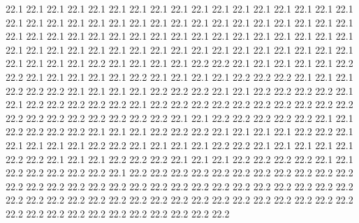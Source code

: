 22.1
22.1
22.1
22.1
22.1
22.1
22.1
22.1
22.1
22.1
22.1
22.1
22.1
22.1
22.1
22.1
22.1
22.1
22.1
22.1
22.1
22.1
22.1
22.1
22.1
22.1
22.1
22.1
22.1
22.1
22.1
22.1
22.1
22.1
22.1
22.1
22.1
22.1
22.1
22.1
22.1
22.1
22.1
22.1
22.1
22.1
22.1
22.1
22.1
22.1
22.1
22.1
22.1
22.1
22.1
22.1
22.1
22.1
22.1
22.1
22.1
22.1
22.1
22.1
22.1
22.1
22.1
22.1
22.1
22.1
22.1
22.1
22.2
22.1
22.1
22.1
22.1
22.2
22.2
22.1
22.1
22.1
22.1
22.1
22.2
22.2
22.1
22.1
22.1
22.1
22.1
22.2
22.1
22.1
22.1
22.1
22.2
22.2
22.2
22.1
22.1
22.1
22.2
22.2
22.2
22.1
22.1
22.1
22.1
22.2
22.2
22.2
22.1
22.1
22.2
22.2
22.2
22.2
22.1
22.1
22.2
22.2
22.2
22.2
22.2
22.1
22.2
22.2
22.2
22.2
22.2
22.2
22.2
22.2
22.2
22.2
22.2
22.2
22.2
22.2
22.2
22.2
22.2
22.2
22.1
22.1
22.2
22.2
22.2
22.2
22.2
22.1
22.1
22.2
22.2
22.2
22.2
22.1
22.1
22.1
22.2
22.2
22.2
22.1
22.1
22.1
22.1
22.2
22.2
22.1
22.1
22.1
22.1
22.1
22.2
22.2
22.1
22.1
22.1
22.1
22.2
22.2
22.1
22.1
22.1
22.1
22.1
22.2
22.2
22.1
22.1
22.1
22.2
22.2
22.2
22.1
22.1
22.1
22.2
22.2
22.2
22.2
22.1
22.1
22.2
22.2
22.2
22.2
22.2
22.1
22.2
22.2
22.2
22.2
22.2
22.2
22.2
22.2
22.2
22.2
22.2
22.2
22.2
22.2
22.2
22.2
22.2
22.2
22.2
22.2
22.2
22.2
22.2
22.2
22.2
22.2
22.2
22.2
22.2
22.2
22.2
22.2
22.2
22.2
22.2
22.2
22.2
22.2
22.2
22.2
22.2
22.2
22.2
22.2
22.2
22.2
22.2
22.2
22.2
22.2
22.2
22.2
22.2
22.2
22.2
22.2
